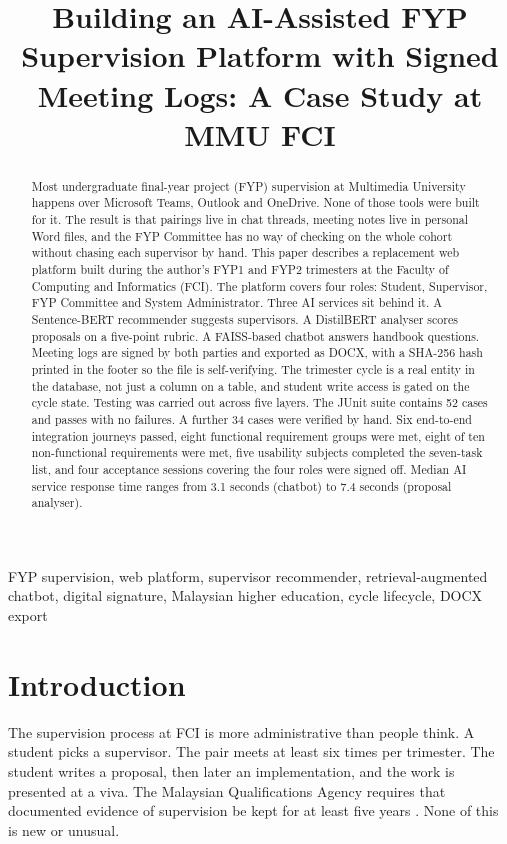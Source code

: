\documentclass[conference,a4paper]{IEEEtran}
\title{Building an AI-Assisted FYP Supervision Platform with Signed Meeting Logs: A Case Study at MMU FCI}
\author{\IEEEauthorblockN{Tai Zhi Xuan}
\IEEEauthorblockA{Faculty of Computing and Informatics\\
Multimedia University\\
Cyberjaya, Selangor, Malaysia\\
Email: taizhixuan@gmail.com}}
\begin{document}
\maketitle

\begin{abstract}
Most undergraduate final-year project (FYP) supervision at Multimedia University happens over Microsoft Teams, Outlook and OneDrive. None of those tools were built for it. The result is that pairings live in chat threads, meeting notes live in personal Word files, and the FYP Committee has no way of checking on the whole cohort without chasing each supervisor by hand. This paper describes a replacement web platform built during the author's FYP1 and FYP2 trimesters at the Faculty of Computing and Informatics (FCI). The platform covers four roles: Student, Supervisor, FYP Committee and System Administrator. Three AI services sit behind it. A Sentence-BERT recommender suggests supervisors. A DistilBERT analyser scores proposals on a five-point rubric. A FAISS-based chatbot answers handbook questions. Meeting logs are signed by both parties and exported as DOCX, with a SHA-256 hash printed in the footer so the file is self-verifying. The trimester cycle is a real entity in the database, not just a column on a table, and student write access is gated on the cycle state. Testing was carried out across five layers. The JUnit suite contains 52 cases and passes with no failures. A further 34 cases were verified by hand. Six end-to-end integration journeys passed, eight functional requirement groups were met, eight of ten non-functional requirements were met, five usability subjects completed the seven-task list, and four acceptance sessions covering the four roles were signed off. Median AI service response time ranges from 3.1 seconds (chatbot) to 7.4 seconds (proposal analyser).
\end{abstract}

\begin{IEEEkeywords}
FYP supervision, web platform, supervisor recommender, retrieval-augmented chatbot, digital signature, Malaysian higher education, cycle lifecycle, DOCX export
\end{IEEEkeywords}

\section{Introduction}
The supervision process at FCI is more administrative than people think. A student picks a supervisor. The pair meets at least six times per trimester. The student writes a proposal, then later an implementation, and the work is presented at a viva. The Malaysian Qualifications Agency requires that documented evidence of supervision be kept for at least five years \cite{mqa2018}. None of this is new or unusual.
\end{document}
